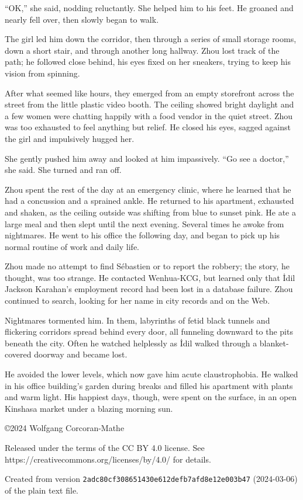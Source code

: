 \documentclass[10pt,a4paper]{article}
\begin{document}
``OK,'' she said, nodding reluctantly. She helped him to his feet. He
groaned and nearly fell over, then slowly began to walk.

The girl led him down the corridor, then through a series of small
storage rooms, down a short stair, and through another long hallway.
Zhou lost track of the path; he followed close behind, his eyes
fixed on her sneakers, trying to keep his vision from spinning.

After what seemed like hours, they emerged from an empty storefront
across the street from the little plastic video booth. The ceiling
showed bright daylight and a few women were chatting happily with
a food vendor in the quiet street. Zhou was too exhausted to feel
anything but relief. He closed his eyes, sagged against the girl
and impulsively hugged her.

She gently pushed him away and looked at him impassively. ``Go see
a doctor,'' she said. She turned and ran off.

\bigskip

Zhou spent the rest of the day at an emergency clinic, where he
learned that he had a concussion and a sprained ankle. He returned
to his apartment, exhausted and shaken, as the ceiling outside was
shifting from blue to sunset pink. He ate a large meal and then slept
until the next evening. Several times he awoke from nightmares.
He went to his office the following day, and began to pick up his
normal routine of work and daily life.

Zhou made no attempt to find S\'{e}bastien or to report the robbery;
the story, he thought, was too strange. He contacted Wenhua-KCG,
but learned only that \.{I}dil Jackson Karahan's employment record
had been lost in a database failure. Zhou continued to search,
looking for her name in city records and on the Web.

Nightmares tormented him. In them, labyrinths of fetid black tunnels
and flickering corridors spread behind every door, all funneling
downward to the pits beneath the city. Often he watched helplessly
as \.{I}dil walked through a blanket-covered doorway and became lost.

He avoided the lower levels, which now gave him acute claustrophobia.
He walked in his office building's garden during breaks and filled
his apartment with plants and warm light. His happiest days, though,
were spent on the surface, in an open Kinshasa market under a
blazing morning sun.

\vfill
\begin{flushleft}
\setlength{\parskip}{\baselineskip}
\copyright 2024 Wolfgang Corcoran-Mathe

Released under the terms of the CC BY 4.0 license. See
https://creativecommons.org/licenses/by/4.0/ for details.

Created from version
\texttt{2adc80cf308651430e612defb7afd8e12e003b47} (2024-03-06) of the
plain text file.
\end{flushleft}
\end{document}
